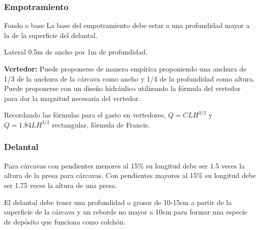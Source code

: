     \subsubsection{Empotramiento}
    Fondo o base La base del empotramiento debe estar a una profundidad mayor a la de la superficie del delantal.
    
    Lateral 0.5m de ancho por 1m de profundidad.
    
    \textbf{Vertedor:} Puede proponerse de manera empírica proponiendo una anchura de 1/3 de la anchura de la cárcava como ancho y 1/4 de la profundidad como altura. Puede proponerse con un diseño hidráulico utilizando la fórmula del vertedor para dar la magnitud necesaria del vertedor.
    
    Recordando las fórmulas para el gasto en vertedores, $Q=CLH^{3/2}$ y $Q=1.84LH^{3/2}$ rectangular, fórmula de Francis.
    \subsubsection{Delantal}
    Para cárcavas con pendientes menores al 15\% su longitud debe ser 1.5 veces la altura de la presa para cárcavas. Con pendientes mayores al 15\% su longitud debe ser 1.75 veces la altura de una presa.
    
    El delantal debe tener una profundidad o grosor de 10-15cm a partir de la superficie de la cárcava y un reborde no mayor a 10cm para formar una especie de depósito que funciona como colchón.
